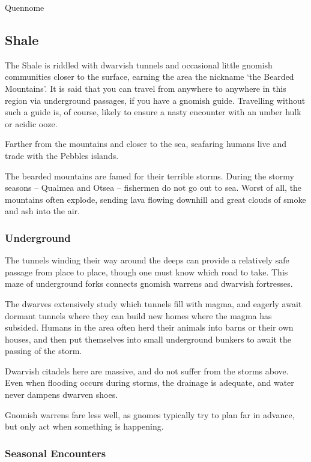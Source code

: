 \begin{multicols}{2}
{\begin{encounters}{Quennome}
\end{encounters}
}


\subsection{Shale}

The Shale is riddled with dwarvish tunnels and occasional little gnomish communities closer to the surface, earning the area the nickname `the Bearded Mountains'.
It is said that you can travel from anywhere to anywhere in this region via underground passages, if you have a gnomish guide.
Travelling without such a guide is, of course, likely to ensure a nasty encounter with an umber hulk or acidic ooze.

Farther from the mountains and closer to the sea, seafaring humans live and trade with the Pebbles islands.

The bearded mountains are famed for their terrible storms.
During the stormy seasons -- Qualmea and Otsea -- fishermen do not go out to sea.
Worst of all, the mountains often explode, sending lava flowing downhill and great clouds of smoke and ash into the air.

\subsubsection{Underground}

The tunnels winding their way around the deeps can provide a relatively safe passage from place to place, though one must know which road to take.
This maze of underground forks connects gnomish warrens and dwarvish fortresses.

The dwarves extensively study which tunnels fill with magma, and eagerly await dormant tunnels where they can build new homes where the magma has subsided.
Humans in the area often herd their animals into barns or their own houses, and then put themselves into small underground bunkers to await the passing of the storm.

Dwarvish citadels here are massive, and do not suffer from the storms above.
Even when flooding occurs during storms, the drainage is adequate, and water never dampens dwarven shoes.

Gnomish warrens fare less well, as gnomes typically try to plan far in advance, but only act when something is happening.

\subsubsection{Seasonal Encounters}


\end{multicols}
